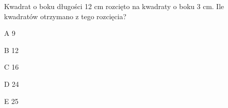 \begin{tresc}
Kwadrat o boku długości 12 cm rozcięto na kwadraty o boku 3 cm. Ile kwadratów otrzymano z tego rozcięcia?
\end{tresc}
\begin{wariant}{A} 9 \end{wariant}
\begin{wariant}{B} 12 \end{wariant}
\begin{wariant}{C} 16 \end{wariant}
\begin{wariant}{D} 24 \end{wariant}
\begin{wariant}{E} 25 \end{wariant}
